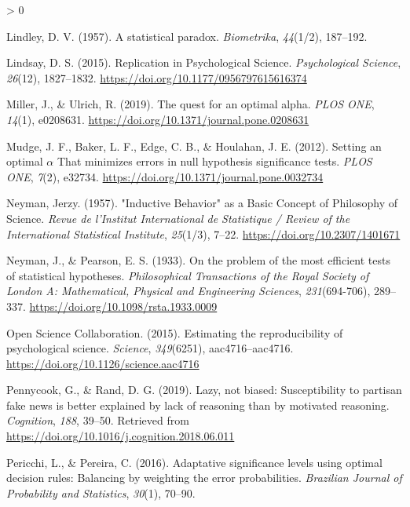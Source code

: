 \documentclass[
  english,
  ,man, a4paper,floatsintext]{apa6}
\newlength{\cslhangindent}
\newenvironment{CSLReferences}[2] %
 {%
  \setlength{\parindent}{0pt}
  \ifodd #1 \everypar{\setlength{\hangindent}{\cslhangindent}}\ignorespaces\fi
  \ifnum #2 > 0
  \setlength{\parskip}{#2\baselineskip}
  \fi
 }%
 {}
\begin{document}
\begin{CSLReferences}{1}{0}
\leavevmode\hypertarget{ref-lindley_statistical_1957}{}%
Lindley, D. V. (1957). A statistical paradox. \emph{Biometrika}, \emph{44}(1/2), 187--192.

\leavevmode\hypertarget{ref-lindsay_2015}{}%
Lindsay, D. S. (2015). Replication in {Psychological Science}. \emph{Psychological Science}, \emph{26}(12), 1827--1832. \url{https://doi.org/10.1177/0956797615616374}

\leavevmode\hypertarget{ref-miller_quest_2019}{}%
Miller, J., \& Ulrich, R. (2019). The quest for an optimal alpha. \emph{PLOS ONE}, \emph{14}(1), e0208631. \url{https://doi.org/10.1371/journal.pone.0208631}

\leavevmode\hypertarget{ref-mudge_setting_2012}{}%
Mudge, J. F., Baker, L. F., Edge, C. B., \& Houlahan, J. E. (2012). Setting an optimal {\(\alpha\)} {That minimizes errors} in {null hypothesis significance tests}. \emph{PLOS ONE}, \emph{7}(2), e32734. \url{https://doi.org/10.1371/journal.pone.0032734}

\leavevmode\hypertarget{ref-neyman_1957}{}%
Neyman, Jerzy. (1957). "{Inductive Behavior}" as a {Basic Concept} of {Philosophy} of {Science}. \emph{Revue de l'Institut International de Statistique / Review of the International Statistical Institute}, \emph{25}(1/3), 7--22. \url{https://doi.org/10.2307/1401671}

\leavevmode\hypertarget{ref-neyman_problem_1933}{}%
Neyman, J., \& Pearson, E. S. (1933). On the problem of the most efficient tests of statistical hypotheses. \emph{Philosophical Transactions of the Royal Society of London A: Mathematical, Physical and Engineering Sciences}, \emph{231}(694-706), 289--337. \url{https://doi.org/10.1098/rsta.1933.0009}

\leavevmode\hypertarget{ref-open2015estimating}{}%
Open Science Collaboration. (2015). Estimating the reproducibility of psychological science. \emph{Science}, \emph{349}(6251), aac4716--aac4716. \url{https://doi.org/10.1126/science.aac4716}

\leavevmode\hypertarget{ref-pennycook2019lazy}{}%
Pennycook, G., \& Rand, D. G. (2019). Lazy, not biased: Susceptibility to partisan fake news is better explained by lack of reasoning than by motivated reasoning. \emph{Cognition}, \emph{188}, 39--50. Retrieved from \url{https://doi.org/10.1016/j.cognition.2018.06.011}

\leavevmode\hypertarget{ref-pericchi2016adaptative}{}%
Pericchi, L., \& Pereira, C. (2016). Adaptative significance levels using optimal decision rules: Balancing by weighting the error probabilities. \emph{Brazilian Journal of Probability and Statistics}, \emph{30}(1), 70--90.


\end{CSLReferences}
\end{document}
